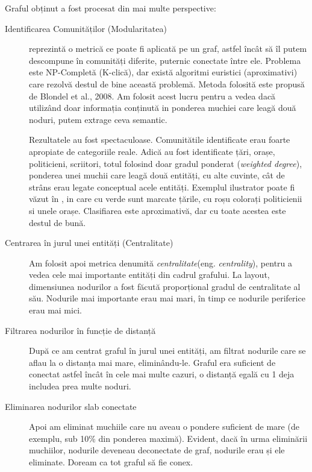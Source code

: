 Graful obținut a fost procesat din mai multe perspective:

\begin{description}

\item[Identificarea Comunităților (Modularitatea)] reprezintă o metrică ce poate fi aplicată pe un graf, astfel încât să îl putem descompune în comunități diferite, puternic conectate între ele. Problema este NP-Completă (K-clică), dar există algoritmi euristici (aproximativi) care rezolvă destul de bine această problemă. Metoda folosită este propusă de Blondel et al., 2008.\cite{Blondel08fastunfolding} Am folosit acest lucru pentru a vedea dacă utilizând doar informația conținută in ponderea muchiei care leagă două noduri, putem extrage ceva semantic.

Rezultatele au fost spectaculoase. Comunitătile identificate erau foarte apropiate de categoriile reale. Adică au fost identificate țări, orașe, politicieni, scriitori, totul folosind doar gradul ponderat (\textit{weighted degree}), ponderea unei muchii care leagă două entități, cu alte cuvinte, cât de strâns erau legate conceptual acele entități. Exemplul ilustrator poate fi văzut în , in care cu verde sunt marcate țările, cu roșu colorați politicienii si unele orașe. Clasifiarea este aproximativă, dar cu toate acestea este destul de bună.
 

 \item[Centrarea în jurul unei entități (Centralitate)] Am folosit apoi metrica denumită \textit{centralitate}(eng. \textit{centrality}), pentru a vedea cele mai importante entități din cadrul grafului. La layout, dimensiunea nodurilor a fost făcută proporțional gradul de centralitate al său. Nodurile mai importante erau mai mari, în timp ce nodurile periferice erau mai mici.
 
 \item[Filtrarea nodurilor în funcție de distanță] După ce am centrat graful în jurul unei entități, am filtrat nodurile care se aflau la o distanța mai mare, eliminându-le. Graful era suficient de conectat astfel încât în cele mai multe cazuri, o distanță egală cu 1 deja includea prea multe noduri.
 
 \item[Eliminarea nodurilor slab conectate] Apoi am eliminat muchiile care nu aveau o pondere suficient de mare (de exemplu, sub 10\% din ponderea maximă). Evident, dacă în urma eliminării muchiilor, nodurile deveneau deconectate de graf, nodurile erau și ele eliminate. Doream ca tot graful să fie conex.
 

\end{description}
